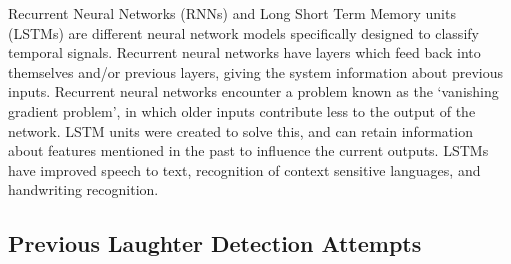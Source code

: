 \documentclass[a4paper,11pt,notitlepage]{article}
\begin{document}
Recurrent Neural Networks (RNNs) and Long Short Term Memory units (LSTMs) are different neural network models specifically designed to classify temporal signals. Recurrent neural networks have layers which feed back into themselves and/or previous layers, giving the system information about previous inputs. Recurrent neural networks encounter a problem known as the `vanishing gradient problem', in which older inputs contribute less to the output of the network. LSTM units were created to solve this, and can retain information about features mentioned in the past to influence the current outputs. LSTMs have improved speech to text\cite{graves2013speech}, recognition of context sensitive languages, and handwriting recognition\cite{greff2016lstm}.

\newpage

\subsection{Previous Laughter Detection Attempts}

\end{document}
